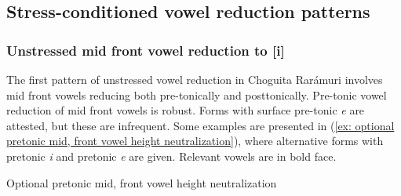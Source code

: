 \subsection{Stress-conditioned vowel reduction patterns}

\subsubsection{Unstressed mid front vowel reduction to [i]}
\label{subsubsec*: unstressed mid front vowel reduction}

The first pattern of unstressed vowel reduction in Choguita Rarámuri involves mid front vowels reducing both pre-tonically and posttonically. Pre-tonic vowel reduction of mid front vowels is robust. Forms with surface pre-tonic \textit{e} are attested, but these are infrequent. Some examples are presented in (\ref{ex: optional pretonic mid, front vowel height neutralization}), where alternative forms with pretonic \textit{i} and pretonic \textit{e} are given. Relevant vowels are in bold face.

\ea\label{ex: optional pretonic mid, front vowel height neutralization}
{Optional pretonic mid, front vowel height neutralization}


